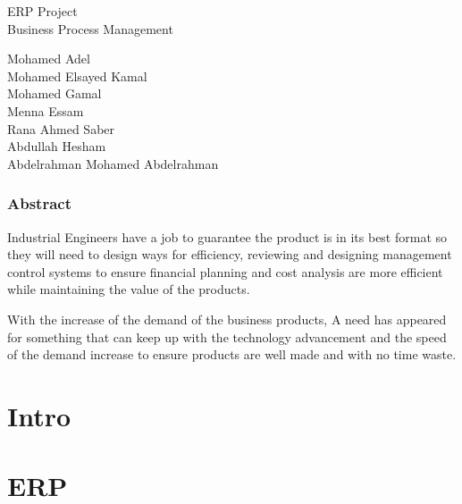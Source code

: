 \documentclass{report}
\begin{document}
    \begin{center}
  
        \LARGE ERP Project\\
        \Large Business Process Management

    \end{center}

    \vspace*{\fill}
        \begingroup
        \centering

            \Large Mohamed Adel\\
            \Large Mohamed Elsayed Kamal\\
            \Large Mohamed Gamal\\
            \Large Menna Essam\\
            \Large Rana Ahmed Saber\\
            \Large Abdullah Hesham\\
            \Large Abdelrahman Mohamed Abdelrahman\\
        
        \endgroup
    \vspace*{\fill}

   \newpage

   
   \section{Abstract}
   \large Industrial Engineers have a job to guarantee the product is in its best format so they will need to design ways for efficiency, reviewing and designing management control systems to ensure financial planning and cost analysis are more efficient while maintaining the value of the products.

   With the increase of the demand of the business products, A need has appeared for something that can keep up with the technology advancement and the speed of the demand increase to ensure products are well made and with no time waste. 
   

   \newpage

    \tableofcontents

    \newpage

    \part{Intro}
    

    \part{ERP}
    
\end{document}
